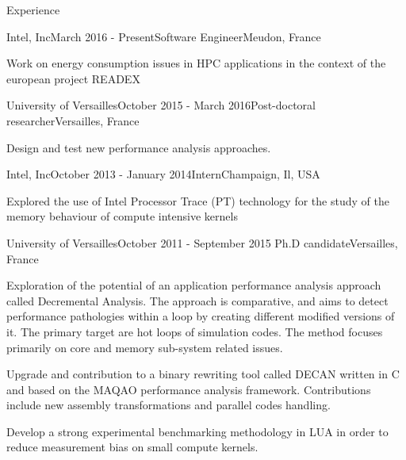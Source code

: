 \documentclass{resume} %
\begin{document}

\begin{rSection}{Experience}

\begin{rSubsection}{Intel, Inc}{March 2016 - Present}{Software Engineer}{Meudon, France}
\item Work on energy consumption issues in HPC applications in the context of the european project READEX
\end{rSubsection}

\begin{rSubsection}{University of Versailles}{October 2015 - March 2016}{Post-doctoral researcher}{Versailles, France}
\item Design and test new performance analysis approaches.  
\end{rSubsection}


\begin{rSubsection}{Intel, Inc}{October 2013 - January 2014}{Intern}{Champaign, Il, USA}
\item Explored the use of Intel Processor Trace (PT) technology for the 
      study of the memory behaviour of compute intensive kernels
\end{rSubsection}


\begin{rSubsection}{University of Versailles}{October 2011 - September 2015}
                   {Ph.D candidate}{Versailles, France}
\item Exploration of the potential of an application performance analysis approach
      called Decremental Analysis. The approach is comparative, and aims to detect
      performance pathologies within a loop by creating different modified versions
      of it. The primary target are hot loops of simulation codes. The method focuses 
      primarily on core and memory sub-system related issues.
\item Upgrade and contribution to a binary rewriting tool called DECAN written in C
      and based on the MAQAO performance analysis framework. Contributions include
      new assembly transformations and parallel codes handling.   
\item Develop a strong experimental benchmarking methodology in LUA in order to 
      reduce measurement bias on small compute kernels. 
\end{rSubsection}



\end{rSection}
\end{document}
